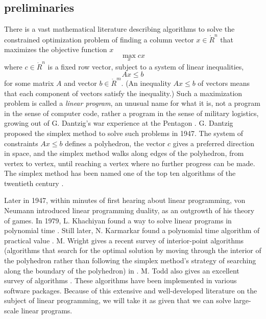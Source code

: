 \subsection{preliminaries}

There is a vast mathematical literature describing algorithms to
solve the constrained optimization problem of finding a column vector
$x\in\ring{R}^n$ that maximizes the objective function $ x$
    \begin{equation}\label{eqn:lp1}
    \max_{x}  c x
    \end{equation}
where $c\in\ring{R}^n$ is a fixed row vector, subject to a system of linear inequalities,
    \begin{equation}\label{eqn:lp2}
    A x\le b
    \end{equation} 
for some matrix $A$ and vector $b\in
\ring{R}^m$.  (An inequality $A x\le b$ of vectors means that
each component of vectors satisfy the inequality.)
Such a maximization problem is  called a {\it linear program}, an
unusual name for what it is, not a program in the
sense of computer code, rather a program in the sense of military logistics,
growing out of G. Dantzig's war experience at the Pentagon \cite{Dan91}.
G. Dantzig proposed the simplex method to solve such problems in 
1947.  The system of constraints $A x \le b$ defines a polyhedron,
the vector $c$ gives a preferred direction in
space, and the simplex method walks along edges of the polyhedron,
from vertex to vertex, until reaching a vertex where no further
progress can be made.  The simplex method has been named
one of the top ten algorithms of the twentieth century \cite{Cip00}.

Later in 1947, within minutes of first hearing about
linear programming, von Neumann introduced linear programming
duality, as an outgrowth of his theory of games.
In 1979, L. Khachiyan found a way to solve linear programs in
polynomial time \cite{Kha79}.  Still later, 
N. Karmarkar found a polynomial
time algorithm of practical value \cite{Kar84}.  
M. Wright gives a recent survey
of interior-point algorithms (algorithms that search for the 
optimal solution by moving through the interior of the polyhedron
rather than following the simplex method's strategy of searching
along the boundary of the polyhedron) in \cite{Wri05}. 
M. Todd also gives an excellent survey of algorithms \cite{Tod02}.
These algorithms have been implemented in various
software packages.
Because of this extensive and well-developed literature on the
subject of linear programming, we will take it as given that we
can solve large-scale linear programs.


